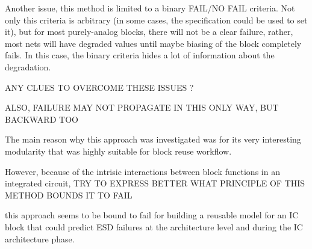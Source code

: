 

Another issue, this method is limited to a binary FAIL/NO FAIL criteria.
Not only this criteria is arbitrary (in some cases, the specification could be used to set it), but
for most purely-analog blocks, there will not be a clear failure, rather, most
nets will have degraded values until maybe biasing of the block completely fails.
In this case, the binary criteria hides a lot of information about the degradation.

ANY CLUES TO OVERCOME THESE ISSUES ?

ALSO, FAILURE MAY NOT PROPAGATE IN THIS ONLY WAY, BUT BACKWARD TOO

The main reason why this approach was investigated was for its very interesting modularity
that was highly suitable for block reuse workflow.

However, because of the intrisic interactions between block functions in an integrated circuit,
TRY TO EXPRESS BETTER WHAT PRINCIPLE OF THIS METHOD BOUNDS IT TO FAIL

this approach seems to be bound to fail for building a reusable model for an IC block that could predict
ESD failures at the architecture level and during the IC architecture phase.
